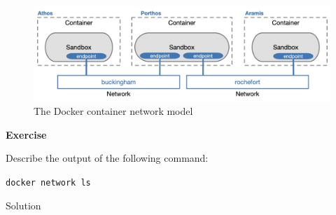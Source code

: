 \documentclass[
]{article}
\newenvironment{infobox}[1]
  {
  \begin{itemize}
  \renewcommand{\labelitemi}{
    \raisebox{-.7\height}[0pt][0pt]{
      
    }
  }
  \setlength{\fboxsep}{1em}
  \begin{whitebox}
  \item
  }
  {
  \end{whitebox}
  \end{itemize}
  }
\theoremstyle{definition}
\theoremstyle{definition}
\theoremstyle{definition}
\theoremstyle{remark}
\let\BeginKnitrBlock\begin \let\EndKnitrBlock\end
\begin{document}
\begin{figure}

{\centering \includegraphics[width=1\linewidth]{cnm} 

}

\caption{The Docker container network model}\label{fig:cnm-docker}
\end{figure}

\begin{infobox}{exercisebox}

\textbf{Exercise}

\BeginKnitrBlock{exercise}
\label{exr:unnamed-chunk-29}{\label{exr:unnamed-chunk-29} }Describe the output of the following command:

\texttt{docker\ network\ ls}
\EndKnitrBlock{exercise}

\end{infobox}

Solution
\end{document}
